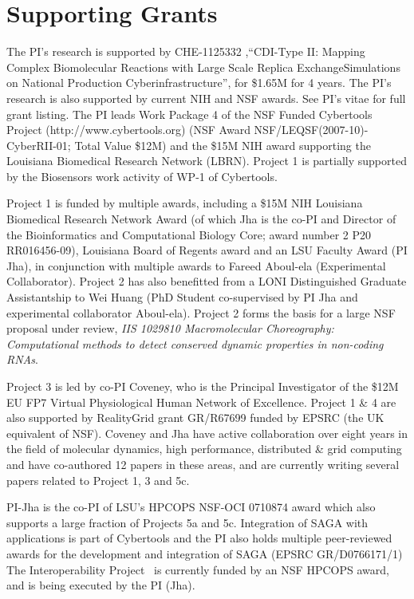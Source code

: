 \documentclass[a4paper,10pt]{article}
\newcommand{\jhanote}[1]{ {\textcolor{red} { ***SJ: #1 }}}
\newcommand{\jhanote}[1]{}
\begin{document}
\section{Supporting Grants}
The PI's research is supported by CHE-1125332 ,``CDI-Type II: Mapping Complex Biomolecular Reactions with Large Scale Replica ExchangeSimulations on National Production Cyberinfrastructure'',  for \$1.65M for 4 years. The PI's research is also supported by current NIH and NSF awards.  See PI's vitae for full grant listing. The PI leads Work Package 4 of the NSF Funded Cybertools Project (http://www.cybertools.org) (NSF Award NSF/LEQSF(2007-10)-CyberRII-01; Total Value \$12M) and the \$15M NIH award supporting the Louisiana Biomedical Research Network (LBRN). Project 1 is partially supported by the Biosensors work activity of WP-1 of Cybertools.

Project 1 is funded by multiple awards, including a \$15M NIH Louisiana Biomedical Research Network Award (of which Jha is the co-PI and Director of the Bioinformatics and Computational Biology Core; award number 2 P20 RR016456-09), Louisiana Board of Regents award and an LSU Faculty Award (PI Jha), in conjunction with multiple awards to Fareed Aboul-ela (Experimental Collaborator). Project 2 has also benefitted from a LONI Distinguished Graduate Assistantship to Wei Huang (PhD Student co-supervised by PI Jha and experimental collaborator Aboul-ela). Project 2 forms the basis for a large NSF proposal under review, {\it IIS 1029810 Macromolecular Choreography: Computational methods to detect conserved dynamic properties in non-coding RNAs}.

Project 3 is led by co-PI Coveney, who is the Principal Investigator of the \$12M EU FP7 Virtual Physiological Human Network of Excellence. Project 1 \& 4 are also supported by RealityGrid grant GR/R67699 funded by EPSRC (the UK equivalent of NSF). Coveney and Jha have active collaboration over eight years in the field of molecular dynamics, high performance, distributed \& grid computing and have co-authored 12 papers in these areas, and are currently writing several papers related to Project 1, 3 and 5c.
 
PI-Jha is the co-PI of LSU's HPCOPS NSF-OCI 0710874 award which also
supports a large fraction of Projects 5a and 5c. Integration of SAGA
with applications is part of Cybertools and the PI also holds multiple
peer-reviewed awards for the development and integration of SAGA
(EPSRC GR/D0766171/1) The Interoperability Project~\cite{interop_url}
is currently funded by an NSF HPCOPS award, and is being executed by
the PI (Jha).
\end{document}
